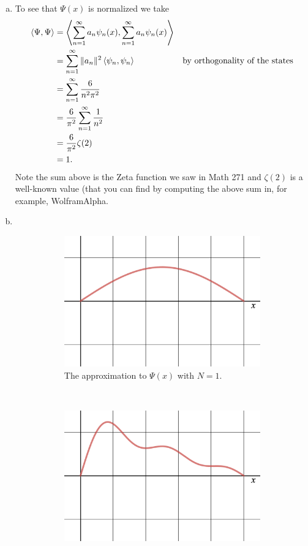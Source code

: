 \documentclass[12pt]{article} %
\begin{document}
\begin{solution}
	\begin{enumerate}[(a)]
		\item To see that $\Psi(x)$ is normalized we take
		\begin{align*}
			\left\langle \Psi, \Psi \right\rangle &= \left\langle \sum_{n=1}^\infty a_n \psi_n(x), \sum_{n=1}^\infty a_n \psi_n(x) \right\rangle\\
			&= \sum_{n=1}^\infty \|a_n\|^2 \left\langle \psi_n, \psi_n \right\rangle &\textrm{by orthogonality of the states}\\
			&= \sum_{n=1}^\infty \frac{6}{n^2 \pi^2}\\
			&= \frac{6}{\pi^2} \sum_{n=1}^\infty \frac{1}{n^2}\\
			&= \frac{6}{\pi^2} \zeta(2)\\
			&= 1.
		\end{align*}
		Note the sum above is the Zeta function we saw in Math 271 and $\zeta(2)$ is a well-known value (that you can find by computing the above sum in, for example, WolframAlpha.
		\item ~
	\begin{figure}[H]
	\centering
		\begin{subfigure}[h]{0.48\textwidth}
			\centering
			\includegraphics[width=.8\textwidth]{n=1.png}
			\caption{The approximation to $\Psi(x)$ with $N=1$.}
		\end{subfigure}
		~
		\begin{subfigure}[h]{0.48\textwidth}
			\centering
			\includegraphics[width=.8\textwidth]{n=5.png}

\end{subfigure}
\end{figure}
\end{enumerate}
\end{solution}
\end{document}
